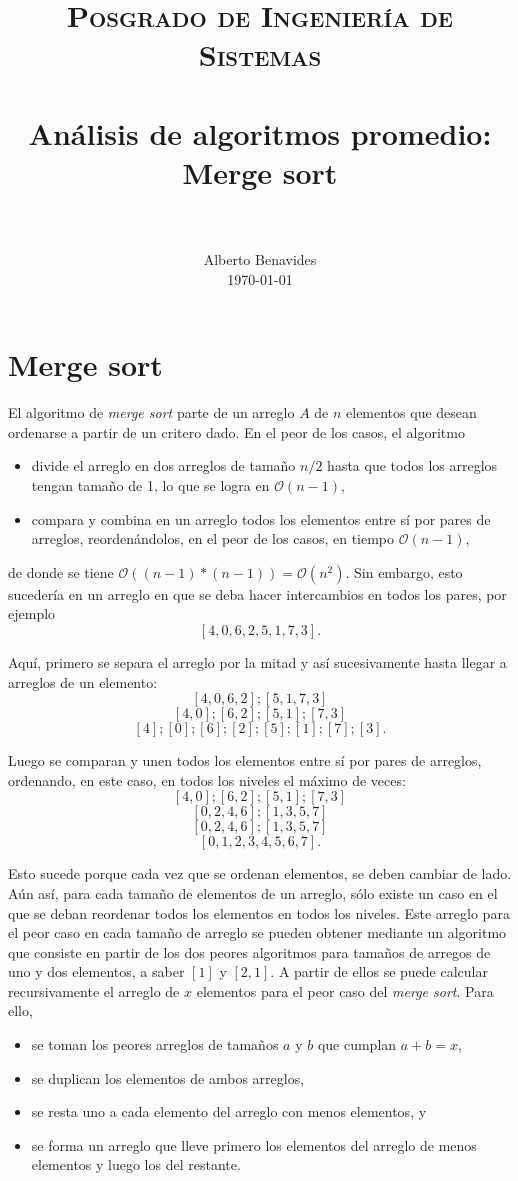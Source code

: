 \documentclass[paper=leter, fontsize=11pt]{scrartcl}
\title{
		\usefont{OT1}{bch}{b}{n}
		\normalfont \normalsize \textsc{Posgrado de Ingeniería de Sistemas} \\ [25pt]
		\horrule{0.5pt} \\[0.4cm]
		\huge Análisis de algoritmos promedio: Merge sort \\
		\horrule{2pt} \\[0.5cm]
}
\author{
		\normalfont 								\normalsize
        Alberto Benavides\\[-3pt]		\normalsize
        \today
}
\date{}
\numberwithin{equation}{section}		%
\numberwithin{figure}{section}			%
\numberwithin{table}{section}				%
\begin{document}
\maketitle

\section{Merge sort} \nocite{aa}
El algoritmo de \textit{merge sort} parte de un arreglo $A$ de $n$ elementos que desean ordenarse a partir de un critero dado. En el peor de los casos, el algoritmo
\begin{itemize}
    \item divide el arreglo en dos arreglos de tamaño $n/2$ hasta que todos los arreglos tengan tamaño de 1, lo que se logra en $\mathcal{O}(n-1)$,
    \item compara y combina en un arreglo todos los elementos entre sí por pares de arreglos, reordenándolos, en el peor de los casos, en tiempo $\mathcal{O}(n-1)$,
\end{itemize}
de donde se tiene $\mathcal{O}((n-1) * (n-1)) = \mathcal{O}(n^2)$. Sin embargo, esto sucedería en un arreglo en que se deba hacer intercambios en todos los pares, por ejemplo
$$[4,0,6,2,5,1,7,3].$$

Aquí, primero se separa el arreglo por la mitad y así sucesivamente hasta llegar a arreglos de un elemento:
$$[4,0,6,2]; [5,1,7,3]$$
$$[4,0]; [6,2]; [5,1]; [7,3]$$
$$[4]; [0]; [6]; [2]; [5]; [1]; [7]; [3].$$

Luego se comparan y unen todos los elementos entre sí por pares de arreglos, ordenando, en este caso, en todos los niveles el máximo de veces:
$$[4, 0]; [6, 2]; [5, 1]; [7, 3]$$
$$[0, 2, 4, 6]; [1, 3, 5, 7]$$
$$[0, 2, 4, 6]; [1, 3, 5, 7]$$
$$[0, 1, 2, 3, 4, 5, 6, 7].$$

Esto sucede porque cada vez que se ordenan elementos, se deben cambiar de lado. Aún así, para cada tamaño de elementos de un arreglo, sólo existe un caso en el que se deban reordenar todos los elementos en todos los niveles. Este arreglo para el peor caso en cada tamaño de arreglo se pueden obtener mediante un algoritmo \cite{worst_merge} que consiste en partir de los dos peores algoritmos para tamaños de arregos de uno y dos elementos, a saber $[1]$ y $[2, 1]$. A partir de ellos se puede calcular recursivamente el arreglo de $x$ elementos para el peor caso del \textit{merge sort}. Para ello,
\begin{itemize}
    \item se toman los peores arreglos de tamaños $a$ y $b$ que cumplan $a + b = x$,
    \item se duplican los elementos de ambos arreglos,
    \item se resta uno a cada elemento del arreglo con menos elementos, y
    \item se forma un arreglo que lleve primero los elementos del arreglo de menos elementos y luego los del restante.
\end{itemize}
\end{document}
